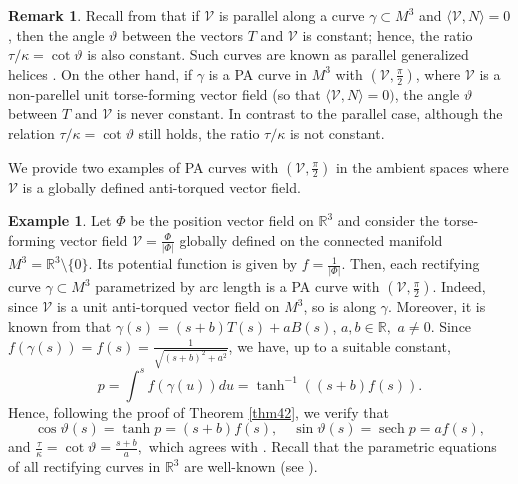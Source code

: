 \documentclass[12pt]{amsart}
\def\r{\mathbb R}
\def\v{\mathcal V}
\DeclareMathOperator{\sech}{sech}
\theoremstyle{definition}
\newtheorem{example}[theorem]{Example}
\newtheorem{remark}[theorem]{Remark}
\begin{document}
\begin{remark}
Recall from \cite[Theorem 1]{dgd} that if $\v$ is parallel along a curve $\gamma\subset M^3$ and $\langle \v,N\rangle=0$, then the angle $\vartheta$ between the vectors $T$ and $\v$ is constant; hence, the ratio $\tau/\kappa = \cot \vartheta$ is also constant. Such curves are known as parallel generalized helices \cite{dgd}. On the other hand, if $\gamma$ is a PA curve in $M^3$ with $(\v,\frac{\pi}{2})$, where $\v$ is a non-parellel unit torse-forming vector field (so that $\langle \v,N\rangle=0)$, the angle $\vartheta$ between $T$ and $\v$ is never constant. In contrast to the parallel case, although the relation $\tau/\kappa=\cot \vartheta$ still holds, the ratio $\tau/\kappa$ is not constant.
\end{remark}

We provide two examples of PA curves with $(\v,\frac{\pi}{2})$ in the ambient spaces where $\v$ is a globally defined anti-torqued vector field.

\begin{example}
Let $\Phi$ be the position vector field on $\r^3$ and consider the torse-forming vector field $\v=\frac{\Phi}{|\Phi|}$ globally defined on the connected manifold $M^3=\r^3\setminus \{0\}$. Its potential function is given by $f=\frac{1}{|\Phi|}$. Then, each rectifying curve $\gamma\subset M^3$ parametrized by arc length is a PA curve with $(\v,\frac{\pi}{2})$. Indeed,  since $\v$ is a unit anti-torqued vector field on $M^3$, so is along $\gamma$. Moreover, it is known from \cite[Theorem 1]{crc00} that $\gamma(s)=(s+b)T(s)+aB(s)$, $a,b\in\r,$ $a\neq0.$ Since $f(\gamma(s))=f(s)=\frac{1}{\sqrt{(s+b)^2+a^2}}$, we have, up to a suitable constant,
$$
p=\int^sf(\gamma(u))du=\tanh ^{-1}\left((s+b)f(s)\right).
$$
Hence, following the proof of Theorem \ref{thm42}, we verify that
$$
\cos \vartheta(s)=\tanh p=(s+b)f(s), \quad \sin \vartheta(s)=\sech p=af(s),
$$
and  $\frac{\tau}{\kappa}=\cot \vartheta=\frac{s+b}{a},$ which agrees with \cite[Theorem 2]{crc00}. Recall that the parametric equations of all rectifying curves in $\r^3$ are well-known (see \cite[Theorem 3]{crc00}).
\end{example}
\end{document}
